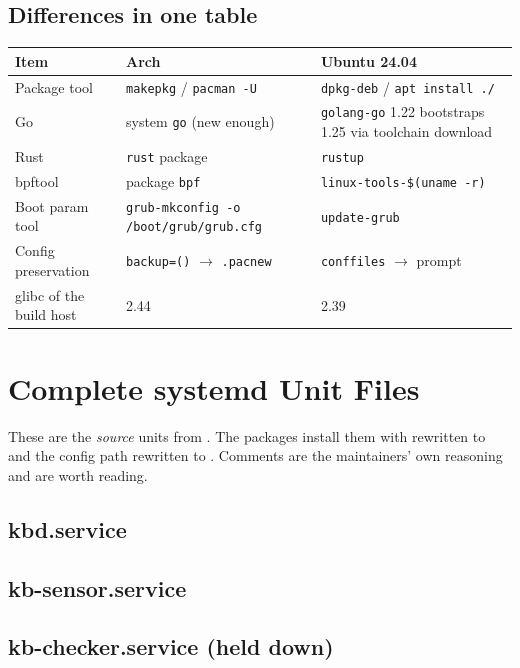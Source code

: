 \section{Differences in one table}
\begin{center}\small
\begin{tabularx}{\textwidth}{@{}L{3.3cm}L{4cm}Y@{}}
\toprule \textbf{Item} & \textbf{Arch} & \textbf{Ubuntu 24.04}\\ \midrule
Package tool & \texttt{makepkg} / \texttt{pacman -U} & \texttt{dpkg-deb} / \texttt{apt install ./}\\
Go & system \texttt{go} (new enough) & \texttt{golang-go} 1.22 bootstraps 1.25 via toolchain download\\
Rust & \texttt{rust} package & \texttt{rustup}\\
bpftool & package \texttt{bpf} & \texttt{linux-tools-\$(uname -r)}\\
Boot param tool & \texttt{grub-mkconfig -o /boot/grub/grub.cfg} & \texttt{update-grub}\\
Config preservation & \texttt{backup=()} $\to$ \texttt{.pacnew} & \texttt{conffiles} $\to$ prompt\\
glibc of the build host & 2.44 & 2.39\\
\bottomrule
\end{tabularx}
\end{center}

\chapter{Complete systemd Unit Files}
\label{app:units}
These are the \emph{source} units from . The packages install them with
 rewritten to  and the  config path rewritten to
. Comments are the maintainers' own reasoning and are worth reading.

\section{kbd.service}
\section{kb-sensor.service}
\section{kb-checker.service (held down)}
